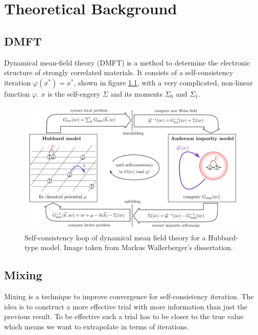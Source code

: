 \chapter{Theoretical Background}
\label{ch:background}

\section{DMFT}

Dynamical mean-field theory (DMFT) is a method to determine the electronic structure of strongly correlated materials. It consists of a self-consistency iteration \(\varphi(x^\ast) = x^\ast\), shown in figure \ref{fig:dmft}, with a very complicated, non-linear function \(\varphi\). $x$ is the self-engery $\Sigma$ and its moments $\Sigma_0$ and $\Sigma_1$.

\begin{figure}[H]
    \centering
    \includegraphics[width=1.0\textwidth]{figures/dmft.png}
    \caption{Self-consistency loop of dynamical mean field theory for a Hubbard-type model. Image taken from Markus Wallerberger's dissertation.\cite{wallerberger2016}}
    \label{fig:dmft}
\end{figure}

\section{Mixing}
Mixing is a technique to improve convergence for self-consistency iteration. The idea is to construct a more effective trial with more information than just the previous result. To be effective such a trial has to be closer to the true value which means we want to extrapolate in terms of iterations.

